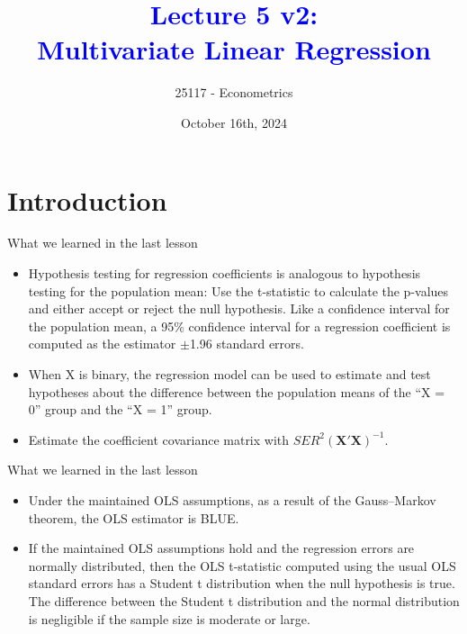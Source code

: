 \documentclass[notes,10pt, aspectratio=169]{beamer}
\title[]{\textcolor{blue}{Lecture 5 v2:\\Multivariate Linear Regression}}
\author{25117 - Econometrics}
\institute[shortinst]{Universitat Pompeu Fabra}
\date{October 16th, 2024}
\begin{document}

\begin{frame}[plain]
\maketitle
\end{frame}

\section{Introduction}

\begin{frame}{What we learned in the last lesson}
\begin{itemize}
    \item Hypothesis testing for regression coefficients is analogous to hypothesis testing for the population mean: Use the t-statistic to calculate the p-values and either accept or reject the null hypothesis. Like a confidence interval for the population mean, a 95\% confidence interval for a regression coefficient is computed as the estimator $\pm$1.96 standard errors.\\[1em]
    \item When X is binary, the regression model can be used to estimate and test hypotheses about the difference between the population means of the “X = 0” group and the “X = 1” group.\\[1em]
    \item Estimate the coefficient covariance matrix with $SER^2(\mathbf{X}'\mathbf{X})^{-1}$.\\[1em]
\end{itemize}
\end{frame}

\begin{frame}{What we learned in the last lesson}
\begin{itemize}
    \item Under the maintained OLS assumptions, as a result of the Gauss–Markov theorem, the OLS estimator is BLUE.\\[1em]
    \item If the maintained OLS assumptions hold and the regression errors are normally distributed, then the OLS t-statistic computed using the usual OLS standard errors has a Student t distribution when the null hypothesis is true. The difference between the Student t distribution and the normal distribution is negligible if the sample size is moderate or large.\\[1em]
\end{itemize}
\end{frame}
\end{document}
